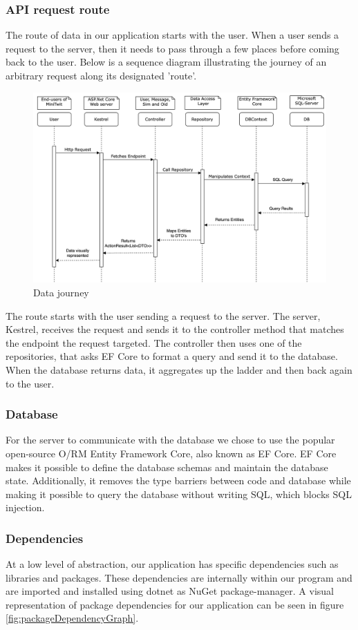 \subsubsection{API request route}
The route of data in our application starts with the user. When a user sends a request to the server, then it needs to pass through a few places before coming back to the user. Below is a sequence diagram illustrating the journey of an arbitrary request along its designated 'route'.

\vspace{3pt}
\begin{figure}[H]
    \centering
    \includegraphics[width=0.65\linewidth]{Images/SequenceDevOps.jpg} 
    \caption{Data journey}
    \label{fig:API_Sequence}
\end{figure}
\vspace{3pt}

The route starts with the user sending a request to the server. The server, Kestrel, receives the request and sends it to the controller method that matches the endpoint the request targeted. The controller then uses one of the repositories, that asks EF Core to format a query and send it to the database. When the database returns data, it aggregates up the ladder and then back again to the user.

\subsubsection{Database}
\noindent For the server to communicate with the database we chose to use the popular open-source O/RM Entity Framework Core, also known as EF Core. EF Core makes it possible to define the database schemas and maintain the database state. Additionally, it removes the type barriers between code and database while making it possible to query the database without writing SQL, which blocks SQL injection.

\subsubsection{Dependencies}
At a low level of abstraction, our application has specific dependencies such as libraries and packages. These dependencies are internally within our program and are imported and installed using dotnet as NuGet package-manager. A visual representation of package dependencies for our application can be seen in figure \ref{fig:packageDependencyGraph}. 

